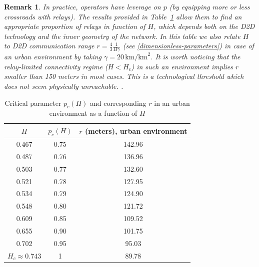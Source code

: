 \documentclass[conference]{IEEEtran}
\newtheorem{remark}{Remark}
\begin{document}
\begin{remark}
In practice, operators have leverage on $p$ (by equipping more or less crossroads with relays). The results provided in Table~\ref{tab-p_c(H)}
allow them to find an appropriate proportion of relays
in function of  $H$, which depends both on the D2D technology and the inner geometry of the network. In this table we also relate $H$ to  D2D communication range $r=\frac{4}{3}\frac{1}{H\gamma}$  (see \eqref{dimensionless-parameters}) in case of an urban environment by taking $\gamma = 20 \, \text{km/km}^{2}$. 
It is worth noticing that the  relay-limited connectivity regime 
($H < H_c$)  in such an environment implies  $r$ smaller  than 150 meters in most cases. This is a technological threshold which does not seem physically unreachable. \cite{lin_comprehensive_2013}. 
\end{remark}
\begin{table}[t!]
\caption{Critical parameter $p_{c}(H)$ and corresponding $r$ in an urban environment as a function of $H$}
\begin{center}
\begin{tabular}{|c|c|c|}
\hline
$H$ & $p_c(H)$ & $r$ (meters), urban environment \\
\hline
0.467 & 0.75 & 142.96  \\
0.487 & 0.76 & 136.96 \\
0.503 & 0.77 & 132.60 \\
0.521 & 0.78 & 127.95  \\
0.534 & 0.79 & 124.90 \\
0.548 & 0.80 & 121.72  \\
0.609 & 0.85 & 109.52 \\
0.655 & 0.90 & 101.75 \\
0.702 & 0.95  & 95.03 \\
$H_c \approx 0.743$ & 1 & 89.78  \\
\hline
\end{tabular}
\label{tab-p_c(H)}
\end{center}
\vspace{-4ex}
\end{table}
\end{document}
